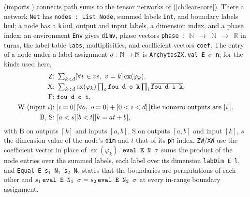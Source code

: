  (imports ) connects path sums to the tensor networks of
 (\cref{ch:lean-core}). There a network \textnormal{\texttt{Net}} has \textnormal{\texttt{nodes : List Node}}, summed
labels \textnormal{\texttt{int}}, and boundary labels \textnormal{\texttt{bnd}}; a node has a \textnormal{\texttt{kind}}, output and input
labels, a dimension index, and a phase index; an environment \textnormal{\texttt{Env}} gives \textnormal{\texttt{dimv}},
phase vectors \textnormal{\texttt{phase : \ensuremath{\mathbb{N}} \ensuremath{\to} \ensuremath{\mathbb{N}} \ensuremath{\to} \ensuremath{\mathbb{R}}}} in turns, the label table \textnormal{\texttt{labs}},
multiplicities, and coefficient vectors \textnormal{\texttt{coef}}. The entry of a node under a label assignment
$\sigma:\mathbb{N}\to\mathbb{N}$ is \textnormal{\texttt{ArchytasZX.\allowbreak{}val E \ensuremath{\sigma} n}}; for the kinds used here,
\begin{align*}
\text{Z:}\ & \textstyle\sum_{k<d}[\forall v\in vs,\ v=k]\operatorname{ex}(\varphi_k),\\
\text{X:}\ & \textstyle\sum_{k<d}\operatorname{ex}(\varphi_k)\prod_{o}\textnormal{\texttt{fou d o k}}\prod_i\overline{\textnormal{\texttt{fou d i k}}},\\
\text{F:}\ & \textnormal{\texttt{fou d o i}},\\
\text{W (input } i\text{):}\ & [i=0]\,[\forall o,\ o=0] + [0<i<d]\,[\text{the nonzero outputs are } [i]],\\
\text{B, S:}\ & [a<s][b<t][k=at+b],
\end{align*}
with B on outputs $[k]$ and inputs $[a,b]$, S on outputs $[a,b]$ and input $[k]$, $s$ the
dimension value of the node's \textnormal{\texttt{dim}} and $t$ that of its \textnormal{\texttt{ph}} index.
\textnormal{\texttt{ZW}}/\textnormal{\texttt{XW}} use the coefficient vector in place of $\operatorname{ex}(\varphi_k)$.
$\textnormal{\texttt{eval E N \ensuremath{\sigma}}}$ sums the product of the node entries over the summed labels, each label
over its dimension \textnormal{\texttt{labDim E l}}, and \textnormal{\texttt{Equal E s\ensuremath{_1} N\ensuremath{_1} s\ensuremath{_2} N\ensuremath{_2}}} states that the boundaries
are permutations of each other and $s_1\,\textnormal{\texttt{eval E N\ensuremath{_1} \ensuremath{\sigma}}} = s_2\,\textnormal{\texttt{eval E N\ensuremath{_2} \ensuremath{\sigma}}}$ at every
in-range boundary assignment.

